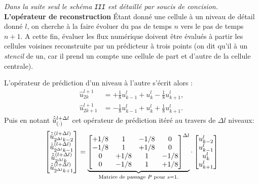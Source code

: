             \emph{Dans la suite seul le schéma \texttt{III} est détaillé par soucis de concision.}\\
            \textbf{L'opérateur de reconstruction}
            Étant donné une cellule à un niveau de détail donné $l$, on cherche à la faire évoluer du pas de temps $n$ vers le pas de temps $n+1$.
            A cette fin, évaluer les flux numérique doivent être évalués à partir les cellules voisines reconstruite par un 
            prédicteur à trois points (on dit qu'il à un \emph{stencil} de un, car il prend un compte une cellule de part et d'autre de la cellule centrale).\par
            L'opérateur de prédiction d'un niveau à l'autre s'écrit alors : 
            \begin{align}
                \hat u^{l+1}_{2k} &= +\frac{1}{8} u^l_{k-1} + u^l_k - \frac{1}{8} u^l_{k+1},\\
                \hat u^{l+1}_{2k+1} &= -\frac{1}{8} u^l_{k-1} + u^l_k + \frac{1}{8} u^l_{k+1}.
            \end{align}
            Puis en notant $\hat{\hat{u}}^{l+\Delta l}_{(\cdot)}$ cet opérateur de prédiction itéré au travers de $\Delta l$ niveaux:
            \begin{align}
                \begin{bmatrix}
                    \hat{\hat{u}}^{(l+\Delta l)}_{2^{\Delta l}k-2}\\
                    \hat{\hat{u}}^{(l+\Delta l)}_{2^{\Delta l}k-1}\\
                    \hat{\hat{u}}^{(l+\Delta l)}_{2^{\Delta l}k}\\
                    \hat{\hat{u}}^{(l+\Delta l)}_{2^{\Delta l}k+1}\\
                \end{bmatrix}
                    =
                \underbrace{
                \begin{bmatrix}
                    +1/8 & 1 & -1/8 & 0 \\
                    -1/8 & 1 & +1/8 & 0 \\
                    0 & +1/8 & 1 & -1/8 \\
                    0 & -1/8 & 1 & +1/8 
                \end{bmatrix}^{\Delta l}}_{\text{Matrice de passage } P \text{ pour }s=1.}
                \cdot
                \begin{bmatrix}
                    u^l_{k-2}\\
                    u^l_{k-1}\\
                    u^l_{k}\\
                    u^l_{k+1}\\
                \end{bmatrix}
            \end{align}
